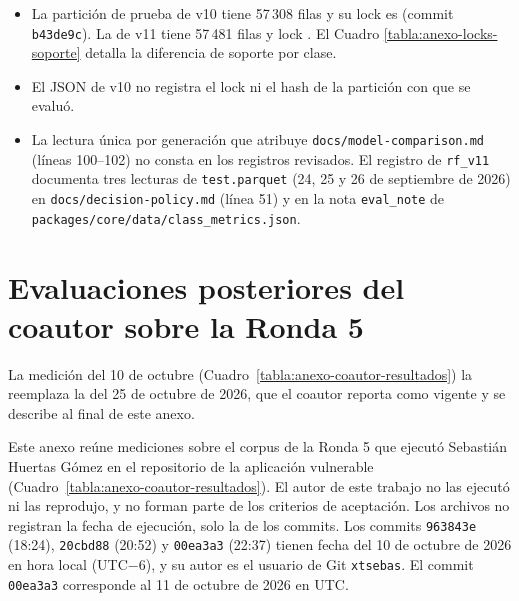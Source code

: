 \begin{itemize}
\item La partición de prueba de v10 tiene 57\,308 filas y su lock es  (commit \texttt{b43de9c}). La de v11 tiene 57\,481 filas y lock . El Cuadro \ref{tabla:anexo-locks-soporte} detalla la diferencia de soporte por clase.
\item El JSON de v10 no registra el lock ni el hash de la partición con que se evaluó.
\item La lectura única por generación que atribuye \texttt{docs/model-comparison.md} (líneas 100--102) no consta en los registros revisados. El registro de \texttt{rf\_v11} documenta tres lecturas de \texttt{test.parquet} (24, 25 y 26 de septiembre de 2026) en \texttt{docs/decision-policy.md} (línea 51) y en la nota \texttt{eval\_note} de \texttt{packages/core/data/class\_metrics.json}.
\end{itemize}

\section{Evaluaciones posteriores del coautor sobre la Ronda 5}\label{anexo:coautor}

La medición del 10 de octubre (Cuadro~\ref{tabla:anexo-coautor-resultados}) la reemplaza la del 25 de octubre de 2026, que el coautor reporta como vigente y se describe al final de este anexo.

Este anexo reúne mediciones sobre el corpus de la Ronda 5 que ejecutó Sebastián Huertas Gómez en el repositorio de la aplicación vulnerable (Cuadro~\ref{tabla:anexo-coautor-resultados}). El autor de este trabajo no las ejecutó ni las reprodujo, y no forman parte de los criterios de aceptación. Los archivos no registran la fecha de ejecución, solo la de los commits. Los commits \texttt{963843e} (18:24), \texttt{20cbd88} (20:52) y \texttt{00ea3a3} (22:37) tienen fecha del 10 de octubre de 2026 en hora local (UTC$-$6), y su autor es el usuario de Git \texttt{xtsebas}. El commit \texttt{00ea3a3} corresponde al 11 de octubre de 2026 en UTC.

